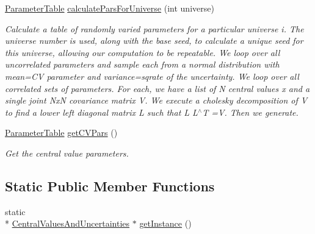 \begin{DoxyCompactItemize}
\hyperlink{class_neutrino_flux_reweight_1_1_parameter_table}{Parameter\-Table} \hyperlink{class_neutrino_flux_reweight_1_1_central_values_and_uncertainties_adc19c53784ebc948f7822b53b087b12e}{calculate\-Pars\-For\-Universe} (int universe)
\begin{DoxyCompactList}\small\item\em Calculate a table of randomly varied parameters for a particular universe i. The universe number is used, along with the base seed, to calculate a unique seed for this universe, allowing our computation to be repeatable. We loop over all uncorrelated parameters and sample each from a normal distribution with mean=C\-V parameter and variance=sqrate of the uncertainty. We loop over all correlated sets of parameters. For each, we have a list of N central values x and a single joint Nx\-N covariance matrix V. We execute a cholesky decomposition of V to find a lower left diagonal matrix L such that L L$^\wedge$\-T =V. Then we generate. \end{DoxyCompactList}\item 
\hyperlink{class_neutrino_flux_reweight_1_1_parameter_table}{Parameter\-Table} \hyperlink{class_neutrino_flux_reweight_1_1_central_values_and_uncertainties_aeb53871d8410760e98c077b80c55ee07}{get\-C\-V\-Pars} ()
\begin{DoxyCompactList}\small\item\em Get the central value parameters. \end{DoxyCompactList}\end{DoxyCompactItemize}
\subsection*{Static Public Member Functions}
\begin{DoxyCompactItemize}
\item 
static \\*
\hyperlink{class_neutrino_flux_reweight_1_1_central_values_and_uncertainties}{Central\-Values\-And\-Uncertainties} $\ast$ \hyperlink{class_neutrino_flux_reweight_1_1_central_values_and_uncertainties_a36e1ceb53aeee872f466785938c7513a}{get\-Instance} ()
\end{DoxyCompactItemize}
